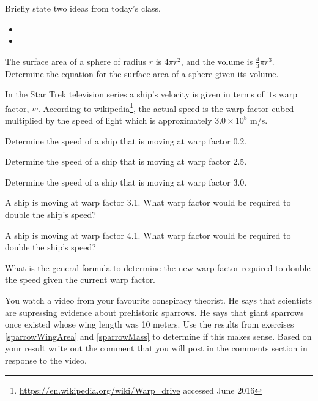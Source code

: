 \begin{problem}
\item Briefly state two ideas from today's class.
  \begin{itemize}
  \item
  \item
  \end{itemize}
\item The surface area of a sphere of radius $r$ is $4\pi r^2$, and
  the volume is $\frac{4}{3}\pi r^3$. Determine the equation for the
  surface area of a sphere given its volume.
\item In the Star Trek television series a ship's velocity is given in
  terms of its warp factor, $w$. According to
  wikipedia\footnote{\href{https://en.wikipedia.org/wiki/Warp_drive}{https://en.wikipedia.org/wiki/Warp\_drive} accessed June 2016},
  the actual speed is the warp factor cubed multiplied by the speed of
  light which is approximately $3.0\times 10^8$ m/s.
  \begin{subproblem}
  \item Determine the speed of a ship that is moving at warp factor 0.2.
  \item Determine the speed of a ship that is moving at warp factor
    2.5.
  \item Determine the speed of a ship that is moving at warp factor
    3.0.
  \item A ship is moving at warp factor 3.1. What warp factor would be
    required to double the ship's speed?
  \item A ship is moving at warp factor 4.1. What warp factor would be
    required to double the ship's speed?
  \item What is the general formula to determine the new warp factor
    required to double the speed given the current warp factor.
  \end{subproblem}

\item You watch a video from your favourite conspiracy theorist.  He
  says that scientists are supressing evidence about prehistoric
  sparrows.  He says that giant sparrows once existed whose wing
  length was 10 meters.  Use the results from exercises
  \ref{sparrowWingArea} and \ref{sparrowMass} to determine if this
  makes sense.  Based on your result write out the comment that you
  will post in the comments section in response to the video.

\end{problem}


